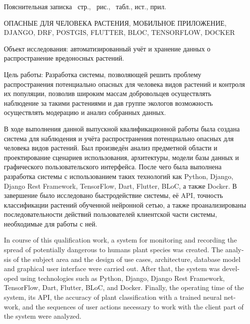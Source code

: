 

\tab
Пояснительная записка \pagescount\ стр., \ рис., \ табл.,  ист.,  прил.

\tab
\MakeUppercase{Опасные для человека растения, Мобильное приложение, Django, DRF, PostGIS, Flutter, BLoC, TensorFlow, Docker}

\tab
Объект исследования: автоматизированный учёт и хранение данных о распространение вредоносных растений.

\tab
Цель работы: Разработка системы, позволяющей решить проблему распространения потенциально опасных для человека видов растений и контроля их популяции, позволив широким массам добровольцев осуществлять наблюдение за такими растениями и дав группе экологов возможность осуществлять модерацию и анализ собранных данных.

\tab
В ходе выполнения данной выпускной квалификационной работы была создана система для наблюдения и учёта распространения потенциально опасных для человека видов растений.
Был произведён анализ предметной области и проектирование сценариев использования, архитектуры, модели базы данных и графического пользовательского интерфейса.
После чего была выполнена разработка системы с использованием таких технологий как Python, Django, Django Rest Framework, TensorFlow, Dart, Flutter, BLoC, а также Docker.
В завершение было исследовано быстродействие системы, её API, точность классификации растений обученной нейронной сетью, а также проанализированы последовательности действий пользователей клиентской части системы, необходимые для работы с ней.

\cleardoublepage
{}

\tab
\begin{otherlanguage}{english}
	In course of this qualification work, a system for monitoring and recording the spread of potentially dangerous to humans plant species was created.
	The analysis of the subject area and the design of use cases, architecture, database model and graphical user interface were carried out.
	After that, the system was developed using technologies such as Python, Django, Django Rest Framework, TensorFlow, Dart, Flutter, BLoC, and Docker.
	Finally, the operating time of the system, its API, the accuracy of plant classification with a trained neural network, and the sequences of user actions necessary to work with the client part of the system were analyzed.
\end{otherlanguage}
